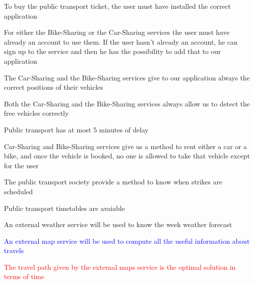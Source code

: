 \begin{domainList}
\item To buy the public transport ticket, the user must have installed the correct application

\item For either the Bike-Sharing or the Car-Sharing services the user must have already an account to use them. If the user hasn't already an account, he can sign up to the service and then he has the possibility to add that to our application

\item The Car-Sharing and the Bike-Sharing services give to our application always the correct positions of their vehicles

\item Both the Car-Sharing and the Bike-Sharing services always allow us to detect the free vehicles correctly

\item Public transport has at most 5 minutes of delay

\item Car-Sharing and Bike-Sharing services give us a method to rent either a car or a bike, and once the vehicle is booked, no one is allowed to take that vehicle except for the user

\item The public transport society provide a method to know when strikes are scheduled

\item Public transport timetables are avaiable

\item An external weather service will be used to know the week weather forecast

\item \textcolor{blue}{An external map service will be used to compute all the useful information about travels}

\item \textcolor{red}{The travel path given by the external maps service is the optimal solution in terms of time}

\end{domainList}

